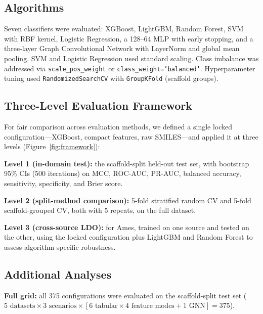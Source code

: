\subsection{Algorithms}

Seven classifiers were evaluated: XGBoost,\cite{Chen_XGBoost_2016} LightGBM,\cite{Ke_LightGBM_2017} Random Forest,\cite{Breiman_2001} SVM with RBF kernel,\cite{Cortes_Vapnik_1995} Logistic Regression,\cite{Cox_1958} a 128--64 MLP with early stopping,\cite{Rumelhart_1986} and a three-layer Graph Convolutional Network\cite{Kipf_Welling_2017} with LayerNorm and global mean pooling. SVM and Logistic Regression used standard scaling. Class imbalance was addressed via \texttt{scale\_pos\_weight} or \texttt{class\_weight='balanced'}. Hyperparameter tuning used \texttt{RandomizedSearchCV} with \texttt{GroupKFold} (scaffold groups).\cite{Pedregosa_sklearn_2011}

\subsection{Three-Level Evaluation Framework}

For fair comparison across evaluation methods, we defined a single locked configuration---XGBoost, compact features, raw SMILES---and applied it at three levels (Figure~\ref{fig:framework}):

\textbf{Level 1 (in-domain test):} the scaffold-split held-out test set, with bootstrap 95\% CIs (500 iterations) on MCC,\cite{Matthews_1975} ROC-AUC, PR-AUC, balanced accuracy, sensitivity, specificity, and Brier score.\cite{Brier_1950}

\textbf{Level 2 (split-method comparison):} 5-fold stratified random CV and 5-fold scaffold-grouped CV, both with 5 repeats, on the full dataset.

\textbf{Level 3 (cross-source LDO):} for Ames, trained on one source and tested on the other, using the locked configuration plus LightGBM and Random Forest to assess algorithm-specific robustness.

\subsection{Additional Analyses}

\textbf{Full grid:} all 375 configurations were evaluated on the scaffold-split test set ($5 \text{ datasets} \times 3 \text{ scenarios} \times [6 \text{ tabular} \times 4 \text{ feature modes} + 1 \text{ GNN}] = 375$).

